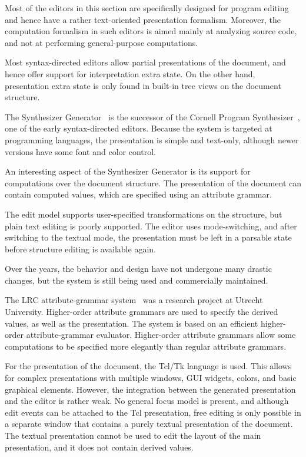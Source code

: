 \documentclass{speauth}
\begin{document}
Most of the editors in this section are specifically designed for program editing and hence have a rather text-oriented presentation formalism. Moreover, the computation formalism in such editors is aimed mainly at analyzing source code, and not at performing general-purpose computations. 

Most syntax-directed editors allow partial presentations of the document, and hence offer support for interpretation extra state. On the other hand, presentation extra state is only found in built-in tree views on the document structure.


The Synthesizer Generator~\cite{reps84synGen} is the successor of the Cornell Program Synthesizer~\cite{teitelbaum81progSynth}, one of the early syntax-directed editors. Because the system is targeted at programming languages, the presentation is simple and text-only, although newer versions have some font and color control. 


An interesting aspect of the Synthesizer Generator is its support for computations over the document structure. The presentation of the document can contain computed values, which are specified using an attribute grammar. 

The edit model supports user-specified transformations on the structure, but plain text editing is poorly supported. The editor uses mode-switching, and after switching to the textual mode, the presentation must be left in a parsable state before structure editing is available again.

Over the years, the behavior and design have not undergone many drastic changes, but the system is still being used and commercially maintained.


The LRC attribute-grammar system~\cite{saraiva00lrc} was a research project at Utrecht University. Higher-order attribute grammars are used to specify the derived values, as well as the presentation. The system is based on an efficient higher-order attribute-grammar evaluator. Higher-order attribute grammars allow some computations to be specified more elegantly than regular attribute grammars.

For the presentation of the document, the Tcl/Tk language is used. This allows for complex presentations with multiple windows, GUI widgets, colors, and basic graphical elements. However, the integration between the generated presentation and the editor is rather weak. No general focus model is present, and although edit events can be attached to the Tcl presentation, free editing is only possible in a separate window that contains a purely textual presentation of the document. The textual presentation cannot be used to edit the layout of the main presentation, and it does not contain derived values. 
\end{document}

